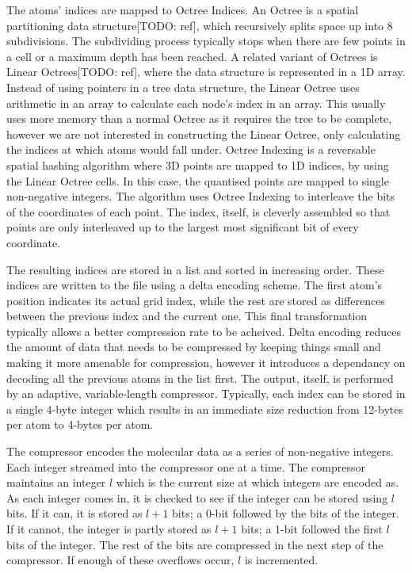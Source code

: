 \documentclass[a4paper,11pt]{report}
\begin{document}
The atoms' indices are mapped to Octree Indices. An Octree is a spatial partitioning data structure[TODO: ref], which recursively splits space up into 8 subdivisions. The subdividing process typically stops when there are few points in a cell or a maximum depth has been reached. A related variant of Octrees is Linear Octrees[TODO: ref], where the data structure is represented in a 1D array. Instead of using pointers in a tree data structure, the Linear Octree uses arithmetic in an array to calculate each node's index in an array. This usually uses more memory than a normal Octree as it requires the tree to be complete, however we are not interested in constructing the Linear Octree, only calculating the indices at which atoms would fall under. Octree Indexing is a reversable spatial hashing algorithm where 3D points are mapped to 1D indices, by using the Linear Octree cells. In this case, the quantised points are mapped to single non-negative integers. The algorithm uses Octree Indexing to interleave the bits of the coordinates of each point. The index, itself, is cleverly assembled so that points are only interleaved up to the largest most significant bit of every coordinate.

The resulting indices are stored in a list and sorted in increasing order. These indices are written to the file using a delta encoding scheme. The first atom's position indicates its actual grid index, while the rest are stored as differences between the previous index and the current one. This final transformation typically allows a better compression rate to be acheived. Delta encoding reduces the amount of data that needs to be compressed by keeping things small and making it more amenable for compression, however it introduces a dependancy on decoding all the previous atoms in the list first. The output, itself, is performed by an adaptive, variable-length compressor. Typically, each index can be stored in a single 4-byte integer which results in an immediate size reduction from 12-bytes per atom to 4-bytes per atom. 

The compressor encodes the molecular data as a series of non-negative integers. Each integer streamed into the compressor one at a time. The compressor maintains an integer $l$ which is the current size at which integers are encoded as. As each integer comes in, it is checked to see if the integer can be stored using $l$ bits. If it can, it is stored as $l+1$ bits; a 0-bit followed by the bits of the integer. If it cannot, the integer is partly stored as $l+1$ bits; a 1-bit followed the first $l$ bits of the integer. The rest of the bits are compressed in the next step of the compressor. If enough of these overflows occur, $l$ is incremented.
\end{document}
